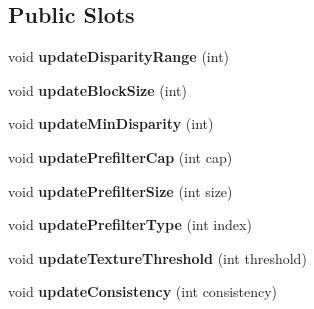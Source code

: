 \subsection*{Public Slots}
\begin{DoxyCompactItemize}
\item 
\hypertarget{class_matcher_widget_open_c_v_block_a50c22ff2dd4734f2cb21dfbfaf645b88}{}void {\bfseries update\+Disparity\+Range} (int)\label{class_matcher_widget_open_c_v_block_a50c22ff2dd4734f2cb21dfbfaf645b88}

\item 
\hypertarget{class_matcher_widget_open_c_v_block_a4a31dd4d9bb6a292d5c1c090da27051e}{}void {\bfseries update\+Block\+Size} (int)\label{class_matcher_widget_open_c_v_block_a4a31dd4d9bb6a292d5c1c090da27051e}

\item 
\hypertarget{class_matcher_widget_open_c_v_block_aab13b7581e24763091f1d522d64dddd8}{}void {\bfseries update\+Min\+Disparity} (int)\label{class_matcher_widget_open_c_v_block_aab13b7581e24763091f1d522d64dddd8}

\item 
\hypertarget{class_matcher_widget_open_c_v_block_ad7bd35d1517af81af30372cc34c7c069}{}void {\bfseries update\+Prefilter\+Cap} (int cap)\label{class_matcher_widget_open_c_v_block_ad7bd35d1517af81af30372cc34c7c069}

\item 
\hypertarget{class_matcher_widget_open_c_v_block_acee1c5e53f54825913d4fca47630c787}{}void {\bfseries update\+Prefilter\+Size} (int size)\label{class_matcher_widget_open_c_v_block_acee1c5e53f54825913d4fca47630c787}

\item 
\hypertarget{class_matcher_widget_open_c_v_block_ac75ba57e87773af65b936f7128b0089a}{}void {\bfseries update\+Prefilter\+Type} (int index)\label{class_matcher_widget_open_c_v_block_ac75ba57e87773af65b936f7128b0089a}

\item 
\hypertarget{class_matcher_widget_open_c_v_block_a2f60d99056426b7e40ae89eea270dd50}{}void {\bfseries update\+Texture\+Threshold} (int threshold)\label{class_matcher_widget_open_c_v_block_a2f60d99056426b7e40ae89eea270dd50}

\item 
\hypertarget{class_matcher_widget_open_c_v_block_a4cce5ad7783756b764c208839fd4d7a4}{}void {\bfseries update\+Consistency} (int consistency)\label{class_matcher_widget_open_c_v_block_a4cce5ad7783756b764c208839fd4d7a4}


\end{DoxyCompactItemize}
